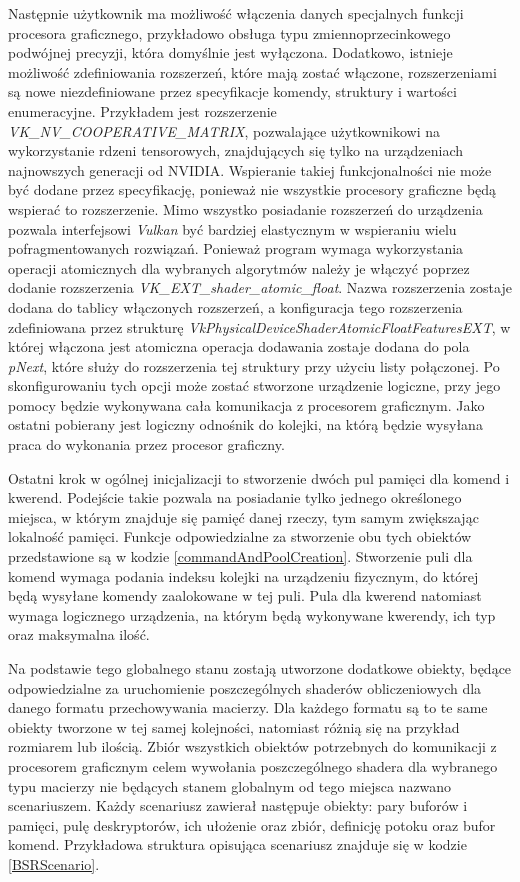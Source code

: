 Następnie użytkownik ma możliwość włączenia danych specjalnych funkcji procesora graficznego, przykładowo obsługa typu zmiennoprzecinkowego podwójnej precyzji, która domyślnie jest wyłączona.
Dodatkowo, istnieje możliwość zdefiniowania rozszerzeń, które mają zostać włączone, rozszerzeniami są nowe niezdefiniowane przez specyfikacje komendy, struktury i wartości enumeracyjne.
Przykładem jest rozszerzenie \textit{VK\_NV\_COOPERATIVE\_MATRIX}, pozwalające użytkownikowi na wykorzystanie rdzeni tensorowych, znajdujących się tylko na urządzeniach najnowszych generacji od NVIDIA.
Wspieranie takiej funkcjonalności nie może być dodane przez specyfikację, ponieważ nie wszystkie procesory graficzne będą wspierać to rozszerzenie.
Mimo wszystko posiadanie rozszerzeń do urządzenia pozwala interfejsowi \textit{Vulkan} być bardziej elastycznym w wspieraniu wielu pofragmentowanych rozwiązań.
Ponieważ program wymaga wykorzystania operacji atomicznych dla wybranych algorytmów należy je włączyć poprzez dodanie rozszerzenia \textit{VK\_EXT\_shader\_atomic\_float}.
Nazwa rozszerzenia zostaje dodana do tablicy włączonych rozszerzeń, a konfiguracja tego rozszerzenia zdefiniowana przez strukturę \textit{VkPhysicalDeviceShaderAtomicFloatFeaturesEXT}, w której włączona jest atomiczna operacja dodawania zostaje dodana do pola \textit{pNext}, które służy do rozszerzenia tej struktury przy użyciu listy połączonej.
Po skonfigurowaniu tych opcji może zostać stworzone urządzenie logiczne, przy jego pomocy będzie wykonywana cała komunikacja z procesorem graficznym.
Jako ostatni pobierany jest logiczny odnośnik do kolejki, na którą będzie wysyłana praca do wykonania przez procesor graficzny. 

\pagebreak

Ostatni krok w ogólnej inicjalizacji to stworzenie dwóch pul pamięci dla komend i kwerend.
Podejście takie pozwala na posiadanie tylko jednego określonego miejsca, w którym znajduje się pamięć danej rzeczy, tym samym zwiększając lokalność pamięci.
Funkcje odpowiedzialne za stworzenie obu tych obiektów przedstawione są w kodzie \ref{commandAndPoolCreation}. 
Stworzenie puli dla komend wymaga podania indeksu kolejki na urządzeniu fizycznym, do której będą wysyłane komendy zaalokowane w tej puli.
Pula dla kwerend natomiast wymaga logicznego urządzenia, na którym będą wykonywane kwerendy, ich typ oraz maksymalna ilość.

\pagebreak

Na podstawie tego globalnego stanu zostają utworzone dodatkowe obiekty, będące odpowiedzialne za uruchomienie poszczególnych shaderów obliczeniowych dla danego formatu przechowywania macierzy.
Dla każdego formatu są to te same obiekty tworzone w tej samej kolejności, natomiast różnią się na przykład rozmiarem lub ilością.
Zbiór wszystkich obiektów potrzebnych do komunikacji z procesorem graficznym celem wywołania poszczególnego shadera dla wybranego typu macierzy nie będących stanem globalnym od tego miejsca nazwano scenariuszem.
Każdy scenariusz zawierał następuje obiekty: pary buforów i pamięci, pulę deskryptorów, ich ułożenie oraz zbiór, definicję potoku oraz bufor komend.
Przykładowa struktura opisująca scenariusz znajduje się w kodzie \ref{BSRScenario}.

